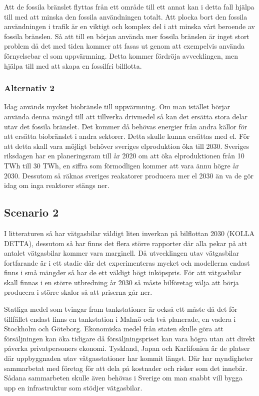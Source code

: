 \documentclass[a4paper,11pt,fleqn, titlepage]{article}
\begin{document}
Att de fossila bränslet flyttas från ett område till ett annat kan i detta fall hjälpa till med att minska den fossila användningen totalt. Att plocka bort den fossila användningen i trafik är en viktigt och komplex del i att minska vårt beroende av fossila bränslen. Så att till en början använda mer fossila bränslen är inget stort problem då det med tiden kommer att fasas ut genom att exempelvis använda förnyelsebar el som uppvärmning. Detta kommer fördröja avvecklingen, men hjälpa till med att skapa en fossilfri bilflotta.

\subsubsection{Alternativ 2}

Idag används mycket biobränsle till uppvärmning. Om man istället börjar använda denna mängd till att tillverka drivmedel så kan det ersätta stora delar utav det fossila bränslet. Det kommer då behövas energier från andra källor för att ersätta biobränslet i andra sektorer. Detta skulle kunna ersättas med el. För att detta skall vara möjligt behöver sveriges elproduktion öka till 2030. Sveriges riksdagen har en planeringsram till år 2020 om att öka elproduktionen från 10 TWh till 30 TWh, en siffra som förmodligen kommer att vara ännu högre år 2030. Dessutom så räknas sveriges reakatorer producera mer el 2030 än va de gör idag om inga reaktorer stängs ner.


\subsection{Scenario 2}
I litteraturen så har vätgasbilar väldigt liten inverkan på bilflottan 2030 (KOLLA DETTA), dessutom så har finns det flera större rapporter där alla pekar på att antalet vätgasbilar kommer vara marginell.
Då utvecklingen utav vätgasbilar fortfarande är i ett stadie där det experimenteras mycket och modellerna endast finns i små mängder så har de ett väldigt högt inköpspris. För att vätgasbilar skall finnas i en större utbredning år 2030 så måste bilföretag välja att börja producera i större skalor så att priserna går ner.

Statliga medel som tvingar fram tankstationer är också ett måste då det för tillfället endast finns en tankstation i Malmö och två planerade, en vadera i Stockholm och Göteborg.
Ekonomiska medel från staten skulle göra att försäljningen kan öka tidigare då försäljningspriset kan vara högra utan att direkt påverka privatpersoners ekonomi.
Tyskland, Japan och Karlifonien är de platser där uppbyggnaden utav vätgasstationer har kommit längst. Där har myndigheter sammarbetat med företag för att dela på kostnader och risker som det innebär. Sådana sammarbeten skulle även behövas i Sverige om man snabbt vill bygga upp en infrastruktur som stödjer vätgasbilar.
\end{document}
